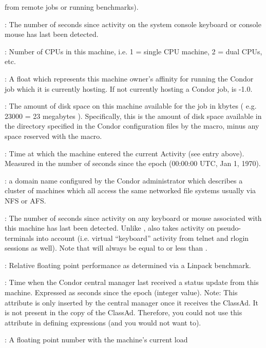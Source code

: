 \begin{description}
from remote jobs or running benchmarks).
%
\item[\AdAttr{ConsoleIdle}] : The number of seconds since activity on the system
console keyboard or console mouse has last been detected.
%
\item[\AdAttr{Cpus}] : Number of CPUs in this machine, i.e. 1 = single CPU machine, 2 = dual
CPUs, etc.
%
\item[\AdAttr{CurrentRank}] : A float which represents this machine owner's affinity
for running the Condor job which it is currently hosting.  If not
currently hosting a Condor job,  is -1.0.
%
\item[\AdAttr{Disk}] : The amount of disk space on this machine available for
the job in kbytes ( e.g. 23000 = 23 megabytes ).  Specifically, this
is the amount of disk space available in the directory specified in
the Condor configuration files by the  macro, minus any
space reserved with the  macro.
%
\item[\AdAttr{EnteredCurrentActivity}] : Time at which the machine entered the 
current Activity (see  entry above).  Measured in the
number of seconds since the epoch (00:00:00 UTC, Jan 1, 1970).
%
\item[\AdAttr{FileSystemDomain}] : a domain name configured by the Condor 
administrator which describes a cluster of machines which all access 
the same networked file systems usually via NFS or AFS.  
%
\item[\AdAttr{KeyboardIdle}] : The number of seconds since activity on any
keyboard or mouse associated with this machine has last been detected.
Unlike ,  also takes activity 
on pseudo-terminals into
account (i.e. virtual ``keyboard'' activity from telnet and rlogin
sessions as well).  Note that  will always be equal to or
less than .
%
\item[\AdAttr{KFlops}] : Relative floating point performance as determined via a
Linpack benchmark.
%
\item[\AdAttr{LastHeardForm}] : Time when the Condor central manager last
received a status update from this machine.  
Expressed as seconds since the epoch (integer value).
Note: This attribute is only inserted by the central manager once it
receives the ClassAd.
It is not present in the  copy of the ClassAd.
Therefore, you could not use this attribute in defining 
expressions (and you would not want to).
%
\item[\AdAttr{LoadAvg}] : A floating point number with the machine's current load

\end{description}
